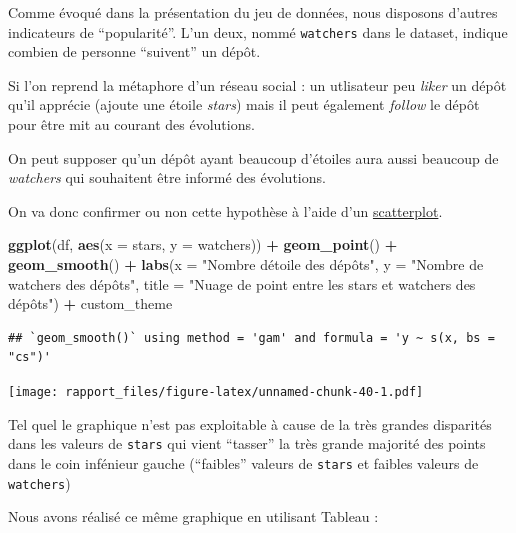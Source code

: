 \documentclass[
]{article}
\newenvironment{Shaded}{\begin{snugshade}}{\end{snugshade}}
\newcommand{\AttributeTok}[1]{\textcolor[rgb]{0.13,0.29,0.53}{#1}}
\newcommand{\FunctionTok}[1]{\textcolor[rgb]{0.13,0.29,0.53}{\textbf{#1}}}
\newcommand{\NormalTok}[1]{#1}
\newcommand{\SpecialCharTok}[1]{\textcolor[rgb]{0.81,0.36,0.00}{\textbf{#1}}}
\newcommand{\StringTok}[1]{\textcolor[rgb]{0.31,0.60,0.02}{#1}}
\begin{document}
Comme évoqué dans la présentation du jeu de données, nous disposons
d'autres indicateurs de ``popularité''. L'un deux, nommé
\texttt{watchers} dans le dataset, indique combien de personne
``suivent'' un dépôt.

Si l'on reprend la métaphore d'un réseau social : un utlisateur peu
\emph{liker} un dépôt qu'il apprécie (ajoute une étoile \emph{stars})
mais il peut également \emph{follow} le dépôt pour être mit au courant
des évolutions.

On peut supposer qu'un dépôt ayant beaucoup d'étoiles aura aussi
beaucoup de \emph{watchers} qui souhaitent être informé des évolutions.

On va donc confirmer ou non cette hypothèse à l'aide d'un
\href{https://datavizcatalogue.com/methods/scatterplot.html}{scatterplot}.

\begin{Shaded}
\begin{Highlighting}[]
\FunctionTok{ggplot}\NormalTok{(df, }\FunctionTok{aes}\NormalTok{(}\AttributeTok{x =}\NormalTok{ stars, }\AttributeTok{y =}\NormalTok{ watchers)) }\SpecialCharTok{+}
  \FunctionTok{geom\_point}\NormalTok{() }\SpecialCharTok{+}
  \FunctionTok{geom\_smooth}\NormalTok{() }\SpecialCharTok{+}
  \FunctionTok{labs}\NormalTok{(}\AttributeTok{x =} \StringTok{"Nombre d\textquotesingle{}étoile des dépôts"}\NormalTok{,}
       \AttributeTok{y =} \StringTok{"Nombre de watchers des dépôts"}\NormalTok{,}
       \AttributeTok{title =} \StringTok{"Nuage de point entre les stars et watchers des dépôts"}\NormalTok{) }\SpecialCharTok{+}
\NormalTok{  custom\_theme}
\end{Highlighting}
\end{Shaded}

\begin{verbatim}
## `geom_smooth()` using method = 'gam' and formula = 'y ~ s(x, bs = "cs")'
\end{verbatim}

\texttt{[image: rapport\_files/figure-latex/unnamed-chunk-40-1.pdf]}

Tel quel le graphique n'est pas exploitable à cause de la très grandes
disparités dans les valeurs de \texttt{stars} qui vient ``tasser'' la
très grande majorité des points dans le coin infénieur gauche
(``faibles'' valeurs de \texttt{stars} et faibles valeurs de
\texttt{watchers})

Nous avons réalisé ce même graphique en utilisant Tableau :
\end{document}
